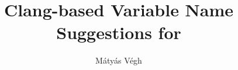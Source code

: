 \documentclass[a4paper,12pt]{report}
\title{Clang-based Variable Name Suggestions for \CC{}}
\author{Mátyás Végh}
\begin{document}


\tableofcontents
\listoffigures
\lstlistoflistings








{}

\end{document}
